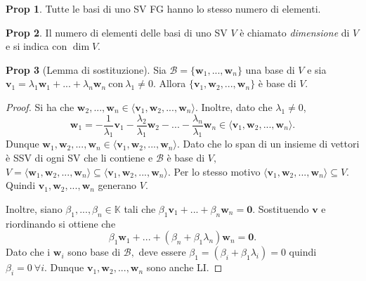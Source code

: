 \documentclass[]{article}
\newcommand{\bl}[1]{\mathbf{#1}}
\newcommand{\vv}{\mathbf{v}}
\newcommand{\vw}{\mathbf{w}}
\theoremstyle{definition}
\theoremstyle{definition}
\newtheorem{prop}{Prop}[subsection]
\theoremstyle{definition}
\begin{document}
\begin{prop} Tutte le basi di uno SV FG hanno lo stesso numero di elementi.

\end{prop} \begin{prop} Il numero di elementi delle basi di uno SV $V$ è chiamato \emph{dimensione} di $V$ e si indica con $\dim V$.

\end{prop} 
\begin{prop}[Lemma di sostituzione] Sia $\mathcal{B} = \{ \vw _1 ,..., \vw _n \}$ una base di $V$ e sia $\vv_1= \lambda _1 \vw _1 + ... + \lambda _n \vw _n\ \mathrm{con}\ \lambda _1 \neq 0$. Allora $\{ \vv _1 , \vw _2 , ... , \vw _n \}$ è base di $V$. 
\end{prop}
\begin{proof}
Si ha che $\vw _2 , ... , \vw _n \in \langle \vv _1 , \vw _2 , ... , \vw _n \rangle$. Inoltre, dato che $\lambda_1 \neq 0$,
$$\vw_1=-\frac{1}{\lambda_1} \vv_1 -\frac{\lambda_2}{\lambda_1} \vw_2-...-\frac{\lambda_n}{\lambda_1} \vw_n \in \langle \vv _1 , \vw _2 , ... , \vw _n \rangle.$$
Dunque $\vw _1 , \vw _2 , ... , \vw _n \in \langle \vv _1 , \vw _2 , ... , \vw _n \rangle$. Dato che lo span di un insieme di vettori è SSV di ogni SV che li contiene e $\mathcal{B}$ è base di $V,$ $V=\langle \vw _1 , \vw _2 , ... , \vw _n \rangle \subseteq \langle \vv _1 , \vw _2 , ... , \vw _n \rangle$. Per lo stesso motivo $\langle \vv _1 , \vw _2 ,...,\vw _n \rangle \subseteq V.$ Quindi $\vv _1 , \vw _2 , ... , \vw _n$ generano $V.$

Inoltre, siano $\beta_1,...,\beta_n \in \mathbb{K}$ tali che $\beta_1 \vv_1 +...+ \beta_n \vw_n = \bl{0}.$ Sostituendo $\vv$ e riordinando si ottiene che 
$$\beta_1 \vw_1+...+(\beta_n + \beta_1 \lambda_n)\vw_n = \bl{0}.$$
Dato che i $\vw_i$ sono base di $\mathcal{B},$ deve essere $\beta_1=(\beta_i + \beta_1 \lambda_i)=0$ quindi $\beta_i=0\ 	\forall i.$ Dunque $\vv _1 , \vw _2 , ... , \vw _n$ sono anche LI.
\end{proof}
\end{document}
